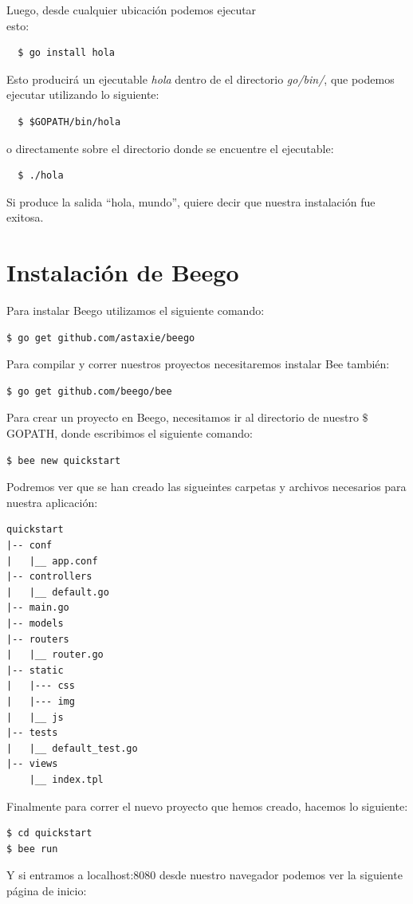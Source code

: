 \documentclass[12pt]{article}
\begin{document}
Luego, desde cualquier ubicación podemos ejecutar\\
esto:
\begin{verbatim}
  $ go install hola
\end{verbatim}

Esto producirá un ejecutable \textit{hola} dentro de el directorio \textit{go/bin/},
que podemos ejecutar utilizando lo siguiente:
\begin{verbatim}
  $ $GOPATH/bin/hola
\end{verbatim}

o directamente sobre el directorio donde se encuentre el ejecutable:

\begin{verbatim}
  $ ./hola
\end{verbatim}

Si produce la salida ``hola, mundo'', quiere decir que nuestra instalación fue exitosa. \newpage


\section*{Instalación de Beego}

\noindent Para instalar Beego utilizamos el siguiente comando:
\begin{verbatim}
$ go get github.com/astaxie/beego
\end{verbatim}

\noindent Para compilar y correr nuestros proyectos necesitaremos instalar Bee también:
\begin{verbatim}
$ go get github.com/beego/bee
\end{verbatim}

\noindent Para crear un proyecto en Beego, necesitamos ir al directorio de nuestro $\$$GOPATH, donde escribimos el siguiente comando:
\begin{verbatim}
$ bee new quickstart
\end{verbatim}
\noindent Podremos ver que se han creado las sigueintes carpetas y archivos necesarios para nuestra aplicación:

\begin{verbatim}
quickstart
|-- conf
|   |__ app.conf
|-- controllers
|   |__ default.go
|-- main.go
|-- models
|-- routers
|   |__ router.go
|-- static
|   |--- css
|   |--- img
|   |__ js
|-- tests
|   |__ default_test.go
|-- views
    |__ index.tpl
\end{verbatim}

\noindent Finalmente para correr el nuevo proyecto que hemos creado,  hacemos lo siguiente:
\begin{verbatim}
$ cd quickstart
$ bee run
\end{verbatim}
\noindent Y si entramos a localhost:8080 desde nuestro navegador podemos ver la siguiente página de inicio: \\
\end{document}
